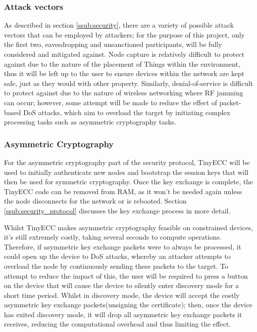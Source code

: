 \documentclass{mprop}
\begin{document}
\subsubsection{Attack vectors} %
\label{ssub:attack_vectors}
As described in section \ref{ssub:security}, there are a variety of possible attack vectors that can be employed by attackers; for the purpose of this project, only the first two, eavesdropping and unsanctioned participants, will be fully considered and mitigated against. Node capture is relatively difficult to protect against due to the nature of the placement of Things within the environment, thus it will be left up to the user to ensure devices within the network are kept safe, just as they would with other property. Similarly, denial-of-service is difficult to protect against due to the nature of wireless networking where RF jamming can occur; however, some attempt will be made to reduce the effect of packet-based DoS attacks, which aim to overload the target by initiating complex processing tasks such as asymmetric cryptography tasks. 


\subsubsection{Asymmetric Cryptography} %
\label{ssub:asymmetric_key_cryptography}
For the asymmetric cryptography part of the security protocol, TinyECC\cite{TinyECC} will be used to initially authenticate new nodes and bootstrap the session keys that will then be used for symmetric cryptography. Once the key exchange is complete, the TinyECC code can be removed from RAM, as it won't be needed again unless the node disconnects for the network or is rebooted. Section \ref{ssub:security_protocol} discusses the key exchange process in more detail.

Whilst TinyECC makes asymmetric cryptography feasible on constrained devices, it's still extremely costly, taking several seconds to compute operations. Therefore, if asymmetric key exchange packets were to always be processed, it could open up the device to DoS attacks, whereby an attacker attempts to overload the node by continuously sending these packets to the target. To attempt to reduce the impact of this, the user will be required to press a button on the device that will cause the device to silently enter discovery mode for a short time period. Whilst in discovery mode, the device will accept the costly asymmetric key exchange packets(unsigning the certificate); then, once the device has exited discovery mode, it will drop all asymmetric key exchange packets it receives, reducing the computational overhead and thus limiting the effect.
\end{document}
